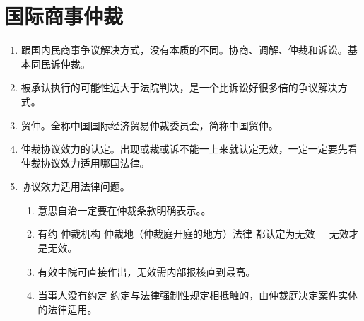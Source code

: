 \section{国际商事仲裁}
\begin{enumerate}
  \item 跟国内民商事争议解决方式，没有本质的不同。协商、调解、仲裁和诉讼。基本同民诉仲裁。
  \item 被承认执行的可能性远大于法院判决，是一个比诉讼好很多倍的争议解决方式。
  \item 贸仲。全称中国国际经济贸易仲裁委员会，简称中国贸仲。
  \item 仲裁协议效力的认定。出现或裁或诉不能一上来就认定无效，一定一定要先看仲裁协议效力适用哪国法律。
  \item 协议效力适用法律问题。
        \begin{enumerate}
          \item 意思自治一定要在仲裁条款明确表示。。
          \item 有约 \yjt 仲裁机构 \hz 仲裁地（仲裁庭开庭的地方）法律 \yjt 都认定为无效 + 无效才是无效。
          \item 有效中院可直接作出，无效需内部报核直到最高。
          \item 当事人没有约定 \hz 约定与法律强制性规定相抵触的，由仲裁庭决定案件实体的法律适用。
        \end{enumerate}
\end{enumerate}
